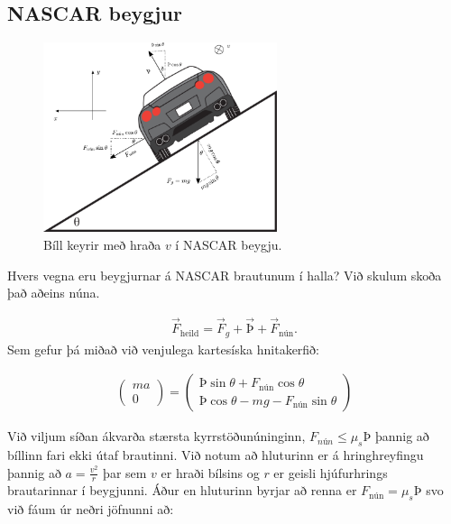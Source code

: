 \newpage

\subsection*{NASCAR beygjur}

\begin{minipage}{\linewidth}
\begin{figure}
\vspace{-1cm}
\centering
\includegraphics[width=2.7in]{figures/bill.pdf}
\caption{Bíll keyrir með hraða $v$ í NASCAR beygju.}
\label{fig:bill}
\end{figure}

Hvers vegna eru beygjurnar á NASCAR brautunum í halla? Við skulum skoða það aðeins núna.

\begin{align*}
    \vec{F}_{\text{heild}} = \vec{F}_g + \vec{\text{Þ}} + \vec{F}_{\text{nún}}.
\end{align*}
Sem gefur þá miðað við venjulega kartesíska hnitakerfið:

\begin{align*}
    \begin{pmatrix} m a \\ 0 \end{pmatrix} = \begin{pmatrix} \text{Þ}\sin\theta + F_{\text{nún}}\cos\theta \\ \text{Þ}\cos\theta - mg - F_{\text{nún}}\sin\theta \end{pmatrix}
\end{align*}

Við viljum síðan ákvarða stærsta kyrrstöðunúninginn, $F_{nún} \leq \mu_s \text{Þ}$ þannig að bíllinn fari ekki útaf brautinni. Við notum að hluturinn er á hringhreyfingu þannig að $a = \frac{v^2}{r}$ þar sem $v$ er hraði bílsins og $r$ er geisli hjúfurhrings brautarinnar í beygjunni. Áður en hluturinn byrjar að renna er $F_{\text{nún}} = \mu_s \text{Þ}$ svo við fáum úr neðri jöfnunni að:


\end{minipage}
